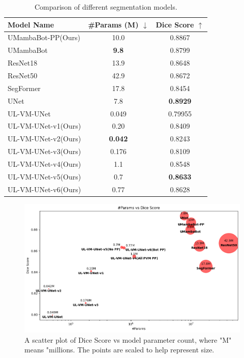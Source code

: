 \documentclass[conference]{IEEEtran}
\begin{document}
\renewcommand{\arraystretch}{1.25}
\begin{table}[ht]
    \centering
    \captionsetup{skip=6pt}
    \begin{tabular}{|l|c|c|}
        \hline
        \textbf{Model Name} & \textbf{\#Params (M) $\downarrow$} & \textbf{Dice Score $\uparrow$} \\
        \hline
        UMambaBot-PP(Ours) & 10.0 & 0.8867 \\
        UMambaBot & \textbf{9.8} & 0.8799 \\
        ResNet18 & 13.9 & 0.8648 \\
        ResNet50 & 42.9 & 0.8672 \\
        SegFormer & 17.8 & 0.8454 \\
        UNet & 7.8 & \textbf{0.8929} \\
        \hline\hline
        UL-VM-UNet & 0.049 & 0.79955 \\
        UL-VM-UNet-v1(Ours) & 0.20 & 0.8409 \\
        UL-VM-UNet-v2(Ours) & \textbf{0.042} & 0.8243 \\
        UL-VM-UNet-v3(Ours) & 0.176 & 0.8109 \\
        UL-VM-UNet-v4(Ours) & 1.1 & 0.8548 \\
        UL-VM-UNet-v5(Ours) & 0.7 & \textbf{0.8633} \\
        UL-VM-UNet-v6(Ours) & 0.77 & 0.8628 \\
        \hline
    \end{tabular}
    \caption{Comparison of different segmentation models.}
    \label{tab:model_comparison}
\end{table}

\begin{figure}[ht]
    \centering
    \includegraphics[width=\columnwidth]{imgs/balls.png}
    \caption{A scatter plot of Dice Score vs model parameter count, where "M" means "millions. The points are scaled to help represent size.}
    \label{fig:balls}
\end{figure}
\end{document}
